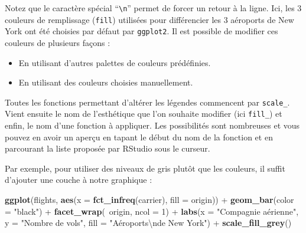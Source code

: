 \documentclass[a4paperpaper,]{article}
\newenvironment{Shaded}{\begin{snugshade}}{\end{snugshade}}
\newcommand{\CharTok}[1]{\textcolor[rgb]{0.57,0.30,0.62}{#1}}
\newcommand{\DataTypeTok}[1]{\textcolor[rgb]{0.00,0.34,0.68}{#1}}
\newcommand{\DecValTok}[1]{\textcolor[rgb]{0.69,0.50,0.00}{#1}}
\newcommand{\KeywordTok}[1]{\textcolor[rgb]{0.12,0.11,0.11}{\textbf{#1}}}
\newcommand{\NormalTok}[1]{\textcolor[rgb]{0.12,0.11,0.11}{#1}}
\newcommand{\OperatorTok}[1]{\textcolor[rgb]{0.12,0.11,0.11}{#1}}
\newcommand{\StringTok}[1]{\textcolor[rgb]{0.75,0.01,0.01}{#1}}
\providecommand{\tightlist}{%
  \setlength{\itemsep}{0pt}\setlength{\parskip}{0pt}}
\begin{document}
Notez que le caractère spécial ``\texttt{\textbackslash{}n}'' permet de forcer un retour à la ligne. Ici, les 3 couleurs de remplissage (\texttt{fill}) utilisées pour différencier les 3 aéroports de New York ont été choisies par défaut par \texttt{ggplot2}. Il est possible de modifier ces couleurs de plusieurs façons :

\begin{itemize}
\tightlist
\item
  En utilisant d'autres palettes de couleurs prédéfinies.
\item
  En utilisant des couleurs choisies manuellement.
\end{itemize}

Toutes les fonctions permettant d'altérer les légendes commencent par \texttt{scale\_}. Vient ensuite le nom de l'esthétique que l'on souhaite modifier (ici \texttt{fill\_}) et enfin, le nom d'une fonction à appliquer. Les possibilités sont nombreuses et vous pouvez en avoir un aperçu en tapant le début du nom de la fonction et en parcourant la liste proposée par RStudio sous le curseur.

Par exemple, pour utiliser des niveaux de gris plutôt que les couleurs, il suffit d'ajouter une couche à notre graphique :

\begin{Shaded}
\begin{Highlighting}[]
\KeywordTok{ggplot}\NormalTok{(flights, }\KeywordTok{aes}\NormalTok{(}\DataTypeTok{x =} \KeywordTok{fct_infreq}\NormalTok{(carrier), }\DataTypeTok{fill =}\NormalTok{ origin)) }\OperatorTok{+}
\StringTok{  }\KeywordTok{geom_bar}\NormalTok{(}\DataTypeTok{color =} \StringTok{"black"}\NormalTok{) }\OperatorTok{+}
\StringTok{  }\KeywordTok{facet_wrap}\NormalTok{(}\OperatorTok{~}\NormalTok{origin, }\DataTypeTok{ncol =} \DecValTok{1}\NormalTok{) }\OperatorTok{+}
\StringTok{  }\KeywordTok{labs}\NormalTok{(}\DataTypeTok{x =} \StringTok{"Compagnie aérienne"}\NormalTok{,}
       \DataTypeTok{y =} \StringTok{"Nombre de vols"}\NormalTok{,}
       \DataTypeTok{fill =} \StringTok{"Aéroports}\CharTok{\textbackslash{}n}\StringTok{de New York"}\NormalTok{) }\OperatorTok{+}
\StringTok{  }\KeywordTok{scale_fill_grey}\NormalTok{()}
\end{Highlighting}
\end{Shaded}
\end{document}

